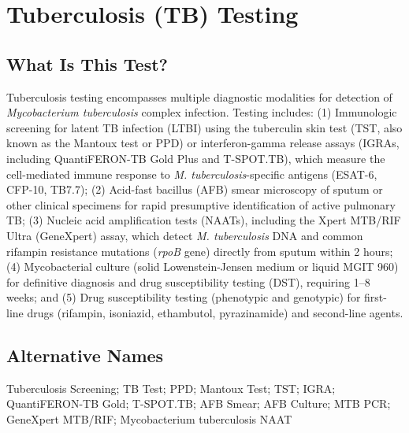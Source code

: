 \chapter{Tuberculosis (TB) Testing}

\section*{What Is This Test?}
Tuberculosis testing encompasses multiple diagnostic modalities for detection of \textit{Mycobacterium tuberculosis} complex infection. Testing includes: (1) Immunologic screening for latent TB infection (LTBI) using the tuberculin skin test (TST, also known as the Mantoux test or PPD) or interferon-gamma release assays (IGRAs, including QuantiFERON-TB Gold Plus and T-SPOT.TB), which measure the cell-mediated immune response to \textit{M. tuberculosis}-specific antigens (ESAT-6, CFP-10, TB7.7); (2) Acid-fast bacillus (AFB) smear microscopy of sputum or other clinical specimens for rapid presumptive identification of active pulmonary TB; (3) Nucleic acid amplification tests (NAATs), including the Xpert MTB/RIF Ultra (GeneXpert) assay, which detect \textit{M. tuberculosis} DNA and common rifampin resistance mutations (\textit{rpoB} gene) directly from sputum within 2 hours; (4) Mycobacterial culture (solid Lowenstein-Jensen medium or liquid MGIT 960) for definitive diagnosis and drug susceptibility testing (DST), requiring 1--8 weeks; and (5) Drug susceptibility testing (phenotypic and genotypic) for first-line drugs (rifampin, isoniazid, ethambutol, pyrazinamide) and second-line agents.

\section*{Alternative Names}
Tuberculosis Screening; TB Test; PPD; Mantoux Test; TST; IGRA; QuantiFERON-TB Gold; T-SPOT.TB; AFB Smear; AFB Culture; MTB PCR; GeneXpert MTB/RIF; Mycobacterium tuberculosis NAAT

